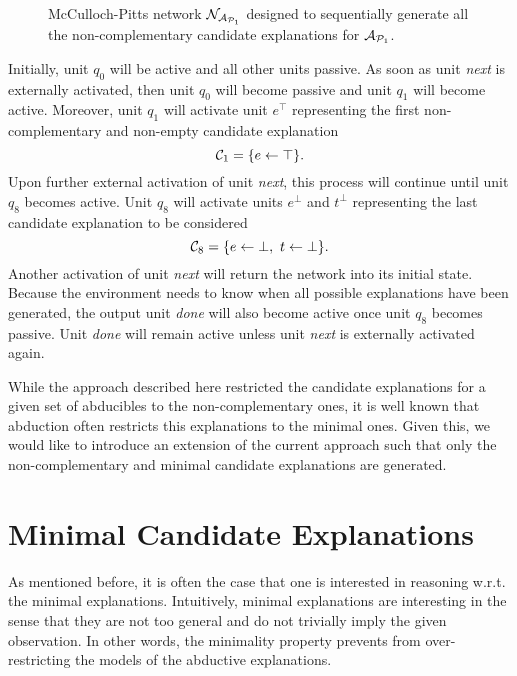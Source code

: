 \begin{figure}[tp]
\begin{center}
\scalebox{1.0}{\NetworkAP}
\end{center}
\caption{McCulloch-Pitts network $\mathcal{N}_{\mathcal{A}_{\mathcal{P}_1}}$ designed to sequentially generate all the non-complementary candidate explanations for $\mathcal{A}_{\mathcal{P}_1}$.}
\label{fig:networkAP}
\end{figure}

Initially, unit $q_0$ will be active and all other units passive. As soon as unit \textit{next} is externally activated, then unit $q_0$ will become passive and unit $q_1$ will become active. Moreover, unit $q_1$ will activate unit $e^\top$ representing the first non-complementary and non-empty candidate explanation
\[
\mathcal{C}_1 = \{ e \leftarrow \top\}.
\] 
Upon further external activation of unit \textit{next}, this process will continue until unit $q_8$ becomes active. Unit $q_8$ will activate units $e^\bot$ and $t^\bot$ representing the last candidate explanation to be considered 
\[
\mathcal{C}_8 = \{e \leftarrow \bot,\ t \leftarrow \bot\}.
\]
Another activation of unit \textit{next} will return the network into its initial state. Because the environment needs to know when all possible explanations have been generated, the output unit \textit{done} will also become active once unit $q_8$ becomes passive. Unit \textit{done} will remain active unless unit \textit{next} is externally activated again. 

While the approach described here restricted the candidate explanations for a given set of abducibles to the non-complementary ones, it is well known that abduction often restricts this explanations to the minimal ones. Given this, we would like to introduce an extension of the current approach such that only the non-complementary and minimal candidate explanations are generated.

\section{Minimal Candidate Explanations}
\label{sec:cn:mce}

As mentioned before, it is often the case that one is interested in reasoning w.r.t. the minimal explanations. Intuitively, minimal explanations are interesting in the sense that they are not too general and do not trivially imply the given observation. In other words, the minimality property prevents from over-restricting the models of the abductive explanations.

